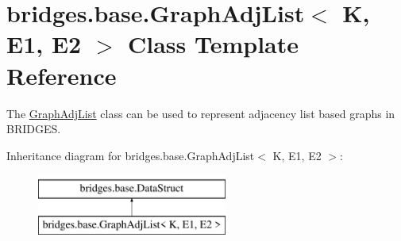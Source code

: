 \hypertarget{classbridges_1_1base_1_1_graph_adj_list}{}\section{bridges.\+base.\+Graph\+Adj\+List$<$ K, E1, E2 $>$ Class Template Reference}
\label{classbridges_1_1base_1_1_graph_adj_list}


The \mbox{\hyperlink{classbridges_1_1base_1_1_graph_adj_list}{Graph\+Adj\+List}} class can be used to represent adjacency list based graphs in B\+R\+I\+D\+G\+ES.  


Inheritance diagram for bridges.\+base.\+Graph\+Adj\+List$<$ K, E1, E2 $>$\+:\begin{figure}[H]
\begin{center}
\leavevmode
\includegraphics[height=2.000000cm]{classbridges_1_1base_1_1_graph_adj_list}
\end{center}
\end{figure}
